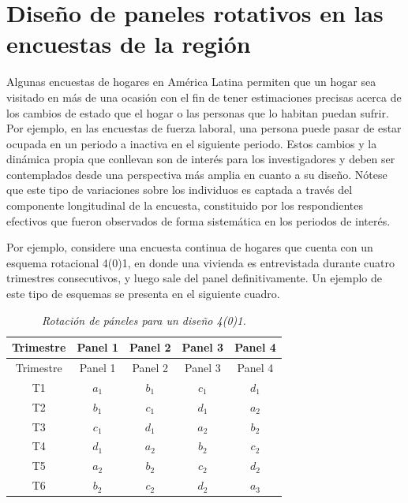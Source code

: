 \documentclass[
  12pt,
]{book}
\begin{document}
\hypertarget{diseuxf1o-de-paneles-rotativos-en-las-encuestas-de-la-regiuxf3n}{%
\section{Diseño de paneles rotativos en las encuestas de la región}\label{diseuxf1o-de-paneles-rotativos-en-las-encuestas-de-la-regiuxf3n}}

Algunas encuestas de hogares en América Latina permiten que un hogar sea visitado en más de una ocasión con el fin de tener estimaciones precisas acerca de los cambios de estado que el hogar o las personas que lo habitan puedan sufrir. Por ejemplo, en las encuestas de fuerza laboral, una persona puede pasar de estar ocupada en un periodo a inactiva en el siguiente periodo. Estos cambios y la dinámica propia que conllevan son de interés para los investigadores y deben ser contemplados desde una perspectiva más amplia en cuanto a su diseño. Nótese que este tipo de variaciones sobre los individuos es captada a través del componente longitudinal de la encuesta, constituido por los respondientes efectivos que fueron observados de forma sistemática en los periodos de interés.

Por ejemplo, considere una encuesta continua de hogares que cuenta con un esquema rotacional 4(0)1, en donde una vivienda es entrevistada durante cuatro trimestres consecutivos, y luego sale del panel definitivamente. Un ejemplo de este tipo de esquemas se presenta en el siguiente cuadro.

\begin{longtable}[]{@{}ccccc@{}}
\caption{\emph{Rotación de páneles para un diseño 4(0)1.}}\tabularnewline
\toprule()
Trimestre & Panel 1 & Panel 2 & Panel 3 & Panel 4 \\
\midrule()
\endfirsthead
\toprule()
Trimestre & Panel 1 & Panel 2 & Panel 3 & Panel 4 \\
\midrule()
\endhead
T1 & \(a_1\) & \(b_1\) & \(c_1\) & \(d_1\) \\
T2 & \(b_1\) & \(c_1\) & \(d_1\) & \(a_2\) \\
T3 & \(c_1\) & \(d_1\) & \(a_2\) & \(b_2\) \\
T4 & \(d_1\) & \(a_2\) & \(b_2\) & \(c_2\) \\
T5 & \(a_2\) & \(b_2\) & \(c_2\) & \(d_2\) \\
T6 & \(b_2\) & \(c_2\) & \(d_2\) & \(a_3\) \\
\bottomrule()
\end{longtable}
\end{document}
